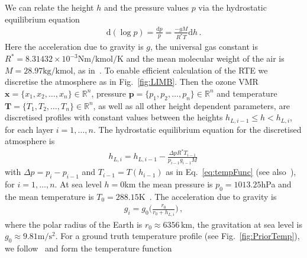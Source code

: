 We can relate the height $h$ and the pressure values $p$ via the hydrostatic equilibrium equation
\begin{align}
	\text{d}(\log p) = \frac{\text{d}p}{p} = \frac{- g M}{R^* T} \text{d} h \, .\label{eq:hydr}
\end{align}
Here the acceleration due to gravity is $g$, the universal gas constant is $R^* = 8.31432 \times 10^{-3} \text{Nm} / \text{kmol} / \text{K}$ and the mean molecular weight of the air is $M = 28.97 \text{kg/kmol}$, as in~\cite{atmosphere1976us}.
To enable efficient calculation of the RTE we discretise the atmosphere as in Fig.~\ref{fig:LIMB}.
Then the ozone VMR $\bm{x} =\{x_1,x_2,\ldots,x_n\} \in \mathbb{R}^{n}$, pressure $\bm{p} =\{p_1,p_2,\ldots,p_n\} \in \mathbb{R}^{n}$ and temperature $\bm{T} =\{T_1,T_2,\ldots,T_n\} \in \mathbb{R}^{n}$, as well as all other height dependent parameters, are discretised profiles with constant values between the heights $h_{L,i-1} \leq h < h_{L,i}$, for each layer $i = 1,\dots, n$.
The hydrostatic equilibrium equation for the discretised atmosphere is
\begin{align}
	h_{L,i} =  h_{L,i-1} - \frac{\Delta p R^* T_{i-1}  }{p_{i-1}  g_{i-1} M} \, 
\end{align}
with $\Delta p = p_{i} - p_{i-1}$ and $T_{i-1} = T(h_{i-1})$ as in Eq.~\ref{eq:tempFunc} (see also~\cite{Carlotti99,Ridolfi00}), for $i = 1,\dots, n$.
At sea level $h = 0$km the mean pressure is $p_0 = 1013.25$hPa and the mean temperature is $T_0 = 288.15$K~\cite{atmosphere1976us}.
The acceleration due to gravity is
\begin{align}
	g_i = g_0 \Bigg( \frac{r_0}{r_0 + h_{L,i}} \Bigg) \, ,
\end{align}
where the polar radius of the Earth is $r_0 \approx 6356 \, \text{km}$, the gravitation at sea level is $g_0 \approx 9.81 \text{m}/\text{s}^2$.
For a ground truth temperature profile (see Fig.~\ref{fig:PriorTemp}), we follow~\cite{atmosphere1976us} and form the temperature function
